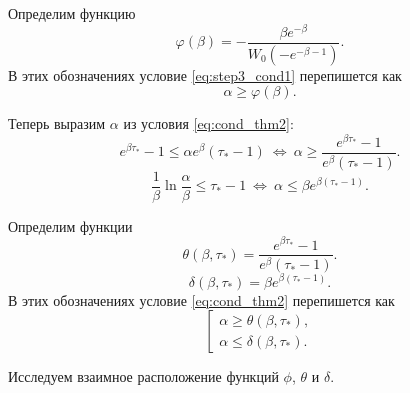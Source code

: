 Определим функцию
\begin{equation}
\label{eq:step_3_phi_func}
\varphi(\beta) = - \dfrac{\beta e^{-\beta}}{W_0(-e^{-\beta - 1})}.
\end{equation}
%
В этих обозначениях условие \eqref{eq:step3_cond1} перепишется как
%
\begin{equation}
\label{eq:step_3_cond_phi}
\alpha \geqslant \varphi(\beta).
\end{equation}

Теперь выразим $\alpha$ из условия \eqref{eq:cond_thm2}:
\begin{equation}
\label{eq:step3_cond2_expanded_1}
e^{\beta \tau_*}-1\leqslant\alpha e^\beta(\tau_*-1)\ \Leftrightarrow\ \alpha \geqslant \dfrac{e^{\beta \tau_*}-1}{e^\beta(\tau_*-1)}.
\end{equation}
\begin{equation}
\label{eq:step3_cond2_expanded_2}
\frac{1}{\beta}\ln\frac{\alpha}{\beta}\leqslant\tau_*-1\ \Leftrightarrow\ \alpha \leqslant \beta e^{\beta (\tau_* - 1)}.
\end{equation}

Определим функции
\begin{equation}
\label{eq:step_3_theta_func}
\theta(\beta, \tau_*) = \dfrac{e^{\beta \tau_*}-1}{e^\beta(\tau_*-1)}.
\end{equation}
%
\begin{equation}
\label{eq:step_3_psi_func}
\delta(\beta, \tau_*) = \beta e^{\beta (\tau_* - 1)}.
\end{equation}
%
В этих обозначениях условие \eqref{eq:cond_thm2} перепишется как
%
\begin{equation}
\label{eq:step_3_cond_2}
\left[
\begin{array}{ll}
	\alpha \geqslant \theta(\beta, \tau_*),\\
	\alpha \leqslant \delta(\beta, \tau_*).
\end{array}
\right.
\end{equation}

Исследуем взаимное расположение функций $\phi$, $\theta$ и $\delta$.

